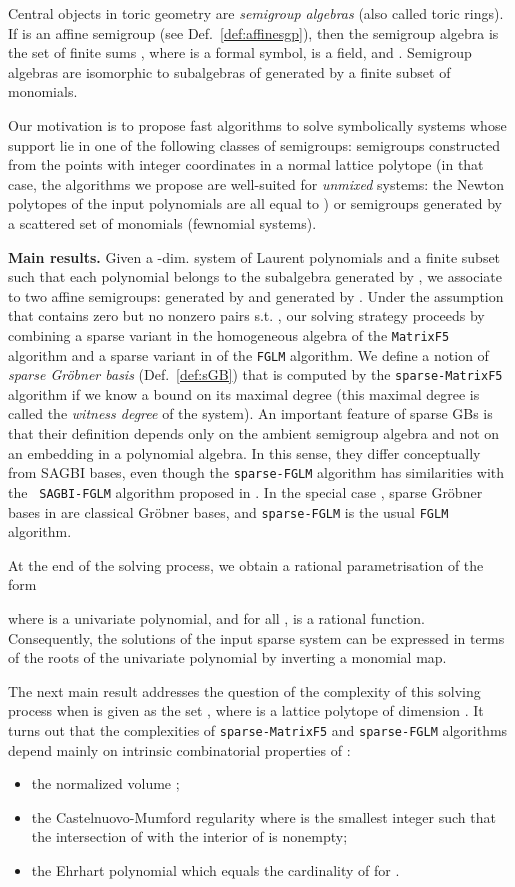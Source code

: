 \documentclass[12pt]{article}
\numberwithin{equation}{section}
\numberwithin{theorem}{section}
\begin{document}
Central objects in toric geometry are \emph{semigroup algebras} (also
called toric rings).  If  is an affine semigroup
(see Def.~\ref{def:affinesgp}), then the semigroup algebra 
is the set of finite sums , where  is a
formal symbol,  is a field,  and . Semigroup
algebras are isomorphic to sub\-algebras of 
generated by a finite subset of monomials.


Our motivation is to propose fast algorithms to solve
symbolically systems whose support lie in one of the following classes
of semigroups: semigroups constructed from the points with integer coordinates
in a normal lattice polytope  (in that case, the
algorithms we propose are well-suited for \emph{unmixed} systems: the
Newton polytopes of the input polynomials are all equal to ) or
semigroups generated by a scattered set of monomials (fewnomial
systems).




{\bf Main results.}  
Given a -dim. system of Laurent polynomials  and a
finite subset  such that each polynomial
belongs to the subalgebra generated by , we associate to  two affine
semigroups:  generated by  and
 generated by
. Under the assumption that
 contains zero but no nonzero pairs 
s.t. , our solving strategy proceeds by combining a
sparse variant in the homogeneous algebra  of the
{\tt MatrixF5} algorithm and a sparse variant in  of the {\tt FGLM}
algorithm. We define a notion of \emph{sparse Gr\"obner basis}
(Def.~\ref{def:sGB}) that is computed by the {\tt sparse-MatrixF5} algorithm
if we know a bound on its maximal degree (this maximal degree is
called the \emph{witness degree} of the system).
An important feature of sparse GBs is that their definition depends
only on the ambient semigroup algebra and not on an embedding in a polynomial
algebra.
In this sense, they differ conceptually from SAGBI bases, even though
the {\tt sparse-FGLM} algorithm has similarities with the {\tt
  SAGBI-FGLM} algorithm proposed in \cite{FR09}. In the special case ,
sparse Gr\"obner bases in  are classical Gr\"obner bases, and {\tt sparse-FGLM} is the usual {\tt FGLM} algorithm.

At the end of the solving
process, we obtain a rational parametrisation of the form

where  is a univariate polynomial, and for all ,  is a rational function.
Consequently, the solutions of the input sparse system 
can be expressed in terms of the roots of the univariate polynomial  by inverting a monomial map.

The next main result addresses the question of the complexity of this solving process when  is given as the set , where  is a lattice polytope of dimension . It turns out that the complexities of {\tt sparse-MatrixF5} and {\tt sparse-FGLM} algorithms depend mainly on intrinsic combinatorial properties of :
\begin{itemize}
\item the normalized volume ;
\item the Castelnuovo-Mumford regularity  where  is the smallest integer such that the intersection of  with the interior of  is nonempty;
\item the Ehrhart polynomial  which equals the cardinality of  for .
\end{itemize}
\end{document}
